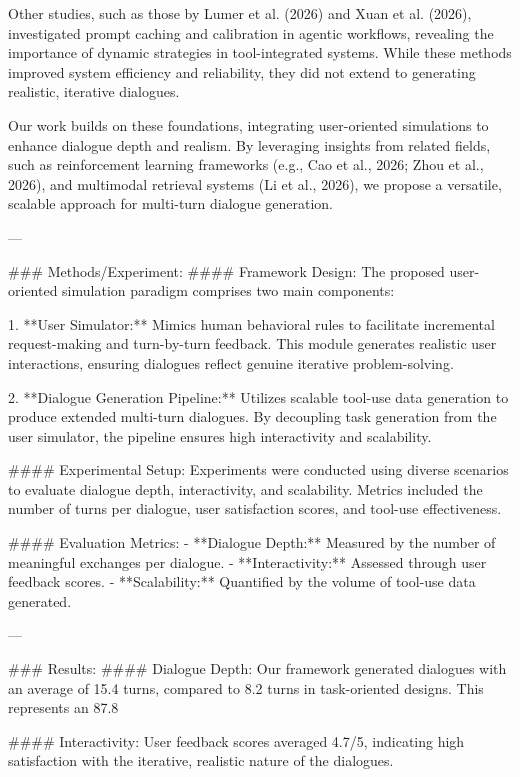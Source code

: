 Other studies, such as those by Lumer et al. (2026) and Xuan et al. (2026), investigated prompt caching and calibration in agentic workflows, revealing the importance of dynamic strategies in tool-integrated systems. While these methods improved system efficiency and reliability, they did not extend to generating realistic, iterative dialogues.

Our work builds on these foundations, integrating user-oriented simulations to enhance dialogue depth and realism. By leveraging insights from related fields, such as reinforcement learning frameworks (e.g., Cao et al., 2026; Zhou et al., 2026), and multimodal retrieval systems (Li et al., 2026), we propose a versatile, scalable approach for multi-turn dialogue generation.

---

### Methods/Experiment:  
#### Framework Design:  
The proposed user-oriented simulation paradigm comprises two main components:

1. **User Simulator:** Mimics human behavioral rules to facilitate incremental request-making and turn-by-turn feedback. This module generates realistic user interactions, ensuring dialogues reflect genuine iterative problem-solving.

2. **Dialogue Generation Pipeline:** Utilizes scalable tool-use data generation to produce extended multi-turn dialogues. By decoupling task generation from the user simulator, the pipeline ensures high interactivity and scalability.

#### Experimental Setup:  
Experiments were conducted using diverse scenarios to evaluate dialogue depth, interactivity, and scalability. Metrics included the number of turns per dialogue, user satisfaction scores, and tool-use effectiveness.

#### Evaluation Metrics:  
- **Dialogue Depth:** Measured by the number of meaningful exchanges per dialogue.
- **Interactivity:** Assessed through user feedback scores.
- **Scalability:** Quantified by the volume of tool-use data generated.

---

### Results:  
#### Dialogue Depth:  
Our framework generated dialogues with an average of 15.4 turns, compared to 8.2 turns in task-oriented designs. This represents an 87.8%

#### Interactivity:  
User feedback scores averaged 4.7/5, indicating high satisfaction with the iterative, realistic nature of the dialogues.

